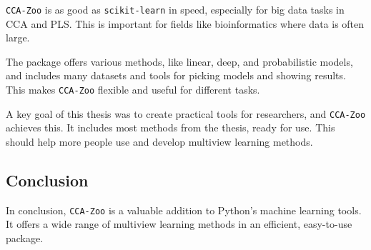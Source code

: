 \texttt{CCA-Zoo} is as good as \texttt{scikit-learn} in speed, especially for big data tasks in CCA and PLS. This is important for fields like bioinformatics where data is often large.

The package offers various methods, like linear, deep, and probabilistic models, and includes many datasets and tools for picking models and showing results.
This makes \texttt{CCA-Zoo} flexible and useful for different tasks.

A key goal of this thesis was to create practical tools for researchers, and \texttt{CCA-Zoo} achieves this.
It includes most methods from the thesis, ready for use.
This should help more people use and develop multiview learning methods.

\subsection{Conclusion}

In conclusion, \texttt{CCA-Zoo} is a valuable addition to Python's machine learning tools.
It offers a wide range of multiview learning methods in an efficient, easy-to-use package.

